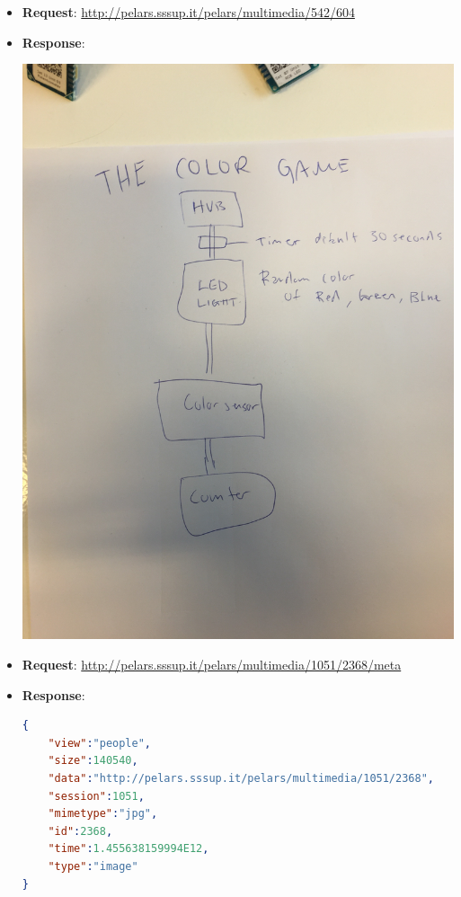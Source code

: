 \documentclass[a4paper,notitlepage,onecolumn]{hitec}  %
\begin{document}
\begin{itemize}
\item \textbf{Request}:  \url{http://pelars.sssup.it/pelars/multimedia/542/604} 
\item \textbf{Response}: 
\begin{center}
\includegraphics[scale=0.09, angle=-90]{604.jpg}
\end{center}
\end{itemize}

\begin{itemize}
\item \textbf{Request}:  \url{http://pelars.sssup.it/pelars/multimedia/1051/2368/meta}
\item \textbf{Response}: 
\begin{lstlisting}[language=json,firstnumber=1]
{
	"view":"people",
	"size":140540,
	"data":"http://pelars.sssup.it/pelars/multimedia/1051/2368",
	"session":1051,
	"mimetype":"jpg",
	"id":2368,
	"time":1.455638159994E12,
	"type":"image"
}
\end{lstlisting} 
\end{itemize}
\end{document}
